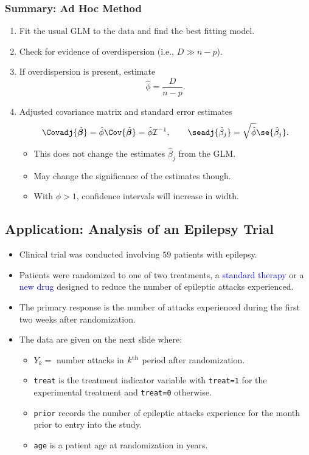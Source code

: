 \documentclass[oneside]{book}\usepackage[]{graphicx}\usepackage[svgnames]{xcolor}
\providecommand{\Vector}[1]{\bm{#1}}%
\begin{document}
\subsubsection*{Summary: Ad Hoc Method}
\begin{enumerate}[1.]
      \item Fit the usual GLM to the data and find the best fitting model.
      \item Check for evidence of overdispersion (i.e., $ D\gg n-p $).
      \item If overdispersion is present, estimate
            \[ \hat{\phi}=\frac{D}{n-p}. \]
      \item Adjusted covariance matrix and standard error estimates
            \[ \Covadj{\hat{\Vector{\beta}}}=\hat{\phi}\Cov{\hat{\Vector{\beta}}}=\hat{\phi}\mathcal{I}^{-1},
                  \qquad \seadj{\hat{\beta}_j}=\sqrt{\hat{\phi}}\se{\hat{\beta}_j}. \]
            \begin{itemize}
                  \item This does not change the estimates $ \hat{\beta}_j $ from the GLM.
                  \item May change the significance of the estimates though.
                  \item With $ \phi>1 $, confidence intervals will increase in width.
            \end{itemize}
\end{enumerate}
\subsection*{Application: Analysis of an Epilepsy Trial}
\begin{itemize}
      \item Clinical trial was conducted involving $59$ patients with epilepsy.
      \item Patients were randomized to one of two treatments, a \textcolor{Blue}{standard therapy} or a \textcolor{Blue}{new drug}
            designed to reduce the number of epileptic attacks experienced.
      \item The primary response is the number of attacks experienced during the first two
            weeks after randomization.
      \item The data are given on the next slide where:
            \begin{itemize}
                  \item $ Y_k= $ number attacks in $ k\textsuperscript{th} $ period after randomization.
                  \item \texttt{treat} is the treatment indicator variable with \texttt{treat=1} for the experimental treatment
                        and \texttt{treat=0} otherwise.
                  \item \texttt{prior} records the number of epileptic attacks experience for the month prior to entry into the study.
                  \item \texttt{age} is a patient age at randomization in years.
            \end{itemize}
\end{itemize}
\end{document}

